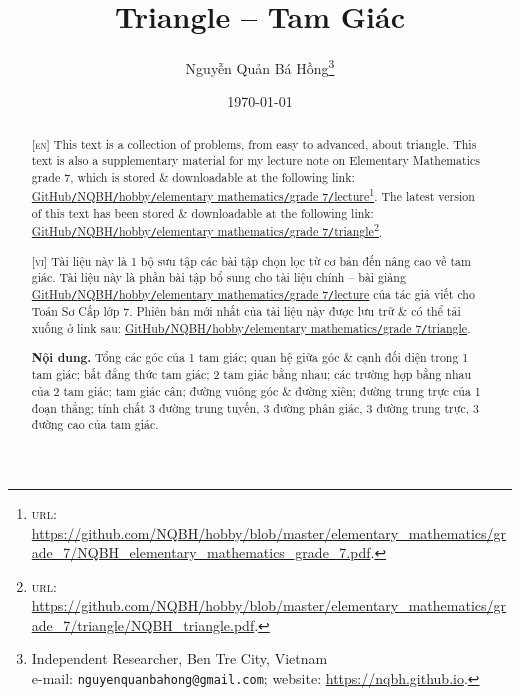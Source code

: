 \documentclass{article}
\title{Triangle -- Tam Giác}
\author{Nguyễn Quản Bá Hồng\footnote{Independent Researcher, Ben Tre City, Vietnam\\e-mail: \texttt{nguyenquanbahong@gmail.com}; website: \url{https://nqbh.github.io}.}}
\date{\today}
\begin{document}
\maketitle
\begin{abstract}
	\textsc{[en]} This text is a collection of problems, from easy to advanced, about triangle. This text is also a supplementary material for my lecture note on Elementary Mathematics grade 7, which is stored \& downloadable at the following link: \href{https://github.com/NQBH/hobby/blob/master/elementary_mathematics/grade_7/NQBH_elementary_mathematics_grade_7.pdf}{GitHub\texttt{/}NQBH\texttt{/}hobby\texttt{/}elementary mathematics\texttt{/}grade 7\texttt{/}lecture}\footnote{\textsc{url}: \url{https://github.com/NQBH/hobby/blob/master/elementary_mathematics/grade_7/NQBH_elementary_mathematics_grade_7.pdf}.}. The latest version of this text has been stored \& downloadable at the following link: \href{https://github.com/NQBH/hobby/blob/master/elementary_mathematics/grade_7/triangle/NQBH_triangle.pdf}{GitHub\texttt{/}NQBH\texttt{/}hobby\texttt{/}elementary mathematics\texttt{/}grade 7\texttt{/}triangle}\footnote{\textsc{url}: \url{https://github.com/NQBH/hobby/blob/master/elementary_mathematics/grade_7/triangle/NQBH_triangle.pdf}.}.
	\vspace{2mm}
	
	\textsc{[vi]} Tài liệu này là 1 bộ sưu tập các bài tập chọn lọc từ cơ bản đến nâng cao về tam giác. Tài liệu này là phần bài tập bổ sung cho tài liệu chính -- bài giảng \href{https://github.com/NQBH/hobby/blob/master/elementary_mathematics/grade_7/NQBH_elementary_mathematics_grade_7.pdf}{GitHub\texttt{/}NQBH\texttt{/}hobby\texttt{/}elementary mathematics\texttt{/}grade 7\texttt{/}lecture} của tác giả viết cho Toán Sơ Cấp lớp 7. Phiên bản mới nhất của tài liệu này được lưu trữ \& có thể tải xuống ở link sau: \href{https://github.com/NQBH/hobby/blob/master/elementary_mathematics/grade_7/triangle/NQBH_triangle.pdf}{GitHub\texttt{/}NQBH\texttt{/}hobby\texttt{/}elementary mathematics\texttt{/}grade 7\texttt{/}triangle}.
	
	\textsf{\textbf{Nội dung.} Tổng các góc của 1 tam giác; quan hệ giữa góc \& cạnh đối diện trong 1 tam giác; bất đẳng thức tam giác; 2 tam giác bằng nhau; các trường hợp bằng nhau của 2 tam giác; tam giác cân; đường vuông góc \& đường xiên; đường trung trực của 1 đoạn thẳng; tính chất 3 đường trung tuyến, 3 đường phân giác, 3 đường trung trực, 3 đường cao của tam giác.}
\end{abstract}
\setcounter{secnumdepth}{4}
\setcounter{tocdepth}{3}
\tableofcontents
\end{document}
